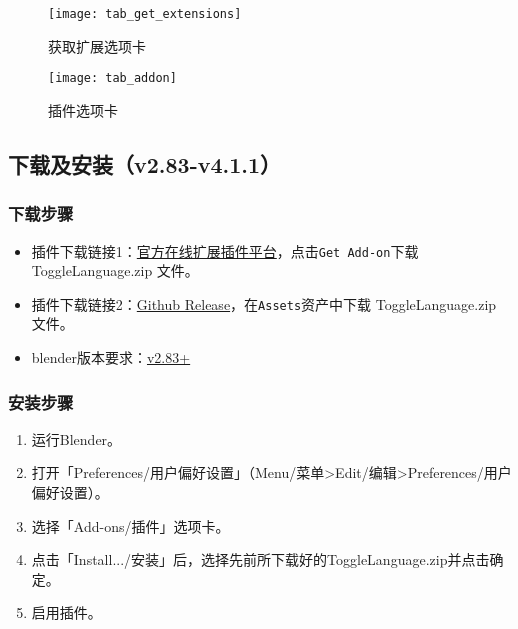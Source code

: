 \documentclass{../../public_resources/doc}
\begin{document}
\begin{figure}[h!]
    \begin{minipage}[t]{0.48\linewidth}
        \texttt{[image: tab\_get\_extensions]}
        \caption{获取扩展选项卡}
    \end{minipage}
    \quad
    \begin{minipage}[t]{0.48\linewidth}
        \texttt{[image: tab\_addon]}
        \caption{插件选项卡}
    \end{minipage}
\end{figure}

\subsection{下载及安装（v2.83-v4.1.1）}
\hypertarget{install_v283_v411}{}
\subsubsection{下载步骤}
\begin{itemize}
    \item 插件下载链接1：\href{https://extensions.blender.org/add-ons/toggle-language/}{官方在线扩展插件平台}，点击\lstinline|Get Add-on|下载 ToggleLanguage.zip 文件。
    \item 插件下载链接2：\href{https://github.com/Mister-Kin/ToggleLanguage/releases/latest}{Github Release}，在\lstinline|Assets|资产中下载 ToggleLanguage.zip 文件。
    \item blender版本要求：\href{https://www.blender.org/download/}{v2.83+}
\end{itemize}

\subsubsection{安装步骤}
\begin{enumerate}
    \item 运行Blender。
    \item 打开「Preferences/用户偏好设置」（Menu/菜单>Edit/编辑>Preferences/用户偏好设置）。
    \item 选择「Add-ons/插件」选项卡。
    \item 点击「Install.../安装」后，选择先前所下载好的ToggleLanguage.zip并点击确定。
    \item 启用插件。
\end{enumerate}
\end{document}
